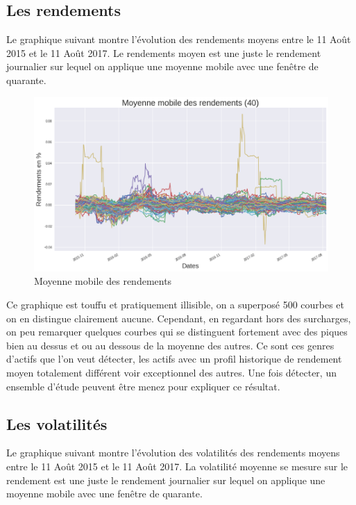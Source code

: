 \subsection{Les rendements}

Le graphique suivant montre l'évolution des rendements moyens entre le 11 Août 2015 et le 11 Août 2017. Le rendements moyen est une juste le rendement journalier sur lequel on applique une moyenne mobile avec une fenêtre de quarante.

\begin{figure}[H]
\centering
\caption{Moyenne mobile des rendements}
   \includegraphics[scale=0.5]{img/rendements.png}
\end{figure}

Ce graphique est touffu et pratiquement illisible, on a superposé 500 courbes et on en distingue clairement aucune. Cependant, en regardant hors des surcharges, on peu remarquer quelques courbes qui se distinguent fortement avec des piques bien au dessus et ou au dessous de la moyenne des autres. Ce sont ces genres d'actifs que l'on veut détecter, les actifs avec un profil historique de rendement moyen totalement différent voir exceptionnel des autres. Une fois détecter, un ensemble d'étude peuvent être menez pour expliquer ce résultat.

\subsection{Les volatilités}

Le graphique suivant montre l'évolution des volatilités des rendements moyens entre le 11 Août 2015 et le 11 Août 2017. La volatilité moyenne se mesure sur le rendement est une juste le rendement journalier sur lequel on applique une moyenne mobile avec une fenêtre de quarante.


